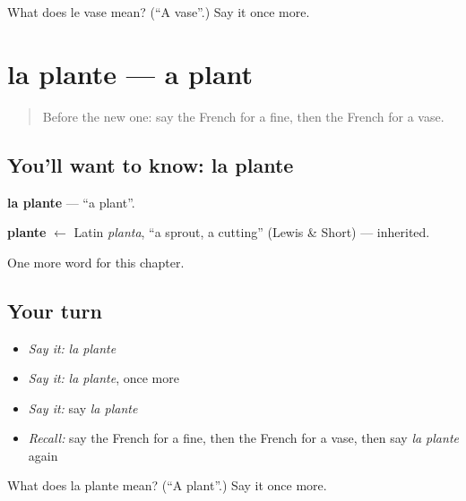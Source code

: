 \begin{tcolorbox}[breakable,colback=teal!4,colframe=teal!35!black,title={Before you move on}]
What does le vase mean? (\textquotedblleft{}A vase\textquotedblright{}.) Say it once more.
\end{tcolorbox}
\section[la plante]{la plante — a plant}

\label{lesson:FR-C228-plante}



\begin{quote}
Before the new one: say the French for a fine, then the French for a vase.
\end{quote}

\subsection*{You'll want to know: la plante}
\textbf{la plante} — \textquotedblleft{}a plant\textquotedblright{}.

\begin{cousinweb}
\textbf{plante} $\leftarrow$ Latin \emph{planta}, \textquotedblleft{}a sprout, a cutting\textquotedblright{} (Lewis \& Short) — inherited.
\end{cousinweb}

\begin{grammarlens}[title={What you've built}]
One more word for this chapter.
\end{grammarlens}

\subsection*{Your turn}
\begin{itemize}
\raggedright
  \item \emph{Say it:} \emph{la plante}
  \item \emph{Say it:} \emph{la plante}, once more
  \item \emph{Say it:} say \emph{la plante}
  \item \emph{Recall:} say the French for a fine, then the French for a vase, then say \emph{la plante} again
\end{itemize}

\begin{tcolorbox}[breakable,colback=teal!4,colframe=teal!35!black,title={Before you move on}]
What does la plante mean? (\textquotedblleft{}A plant\textquotedblright{}.) Say it once more.
\end{tcolorbox}
